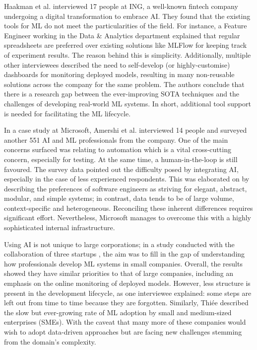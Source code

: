 Haakman et al. \cite{haakman2021ai} interviewed 17 people at ING, a well-known fintech company undergoing a digital transformation to embrace AI. They found that the existing tools for ML do not meet the particularities of the field. For instance, a Feature Engineer working in the Data \& Analytics department explained that regular spreadsheets are preferred over existing solutions like MLFlow for keeping track of experiment results. The reason behind this is simplicity. Additionally, multiple other interviewees described the need to self-develop (or highly-customise) dashboards for monitoring deployed models, resulting in many non-reusable solutions across the company for the same problem. The authors conclude that there is a research gap between the ever-improving SOTA techniques and the challenges of developing real-world ML systems. In short, additional tool support is needed for facilitating the ML lifecycle.

In a case study at Microsoft, Amershi et al. \cite{amershi2019software} interviewed 14 people and surveyed another 551 AI and ML professionals from the company. One of the main concerns surfaced was relating to automation which is a vital cross-cutting concern, especially for testing. At the same time, a human-in-the-loop is still favoured. The survey data pointed out the difficulty posed by integrating AI, especially in the case of less experienced respondents. This was elaborated on by describing the preferences of software engineers as striving for elegant, abstract, modular, and simple systems; in contrast, data tends to be of large volume, context-specific and heterogeneous. Reconciling these inherent differences requires significant effort. Nevertheless, Microsoft manages to overcome this with a highly sophisticated internal infrastructure.

Using AI is not unique to large corporations; in a study conducted with the collaboration of three startups \cite{de2019understanding}, the aim was to fill in the gap of understanding how professionals develop ML systems in small companies. Overall, the results showed they have similar priorities to that of large companies, including an emphasis on the online monitoring of deployed models. However, less structure is present in the development lifecycle, as one interviewee explained: some steps are left out from time to time because they are forgotten. Similarly, Thiée \cite{thiee2021systematic} described the slow but ever-growing rate of ML adoption by small and medium-sized enterprises (SMEs). With the caveat that many more of these companies would wish to adopt data-driven approaches but are facing new challenges stemming from the domain's complexity.

